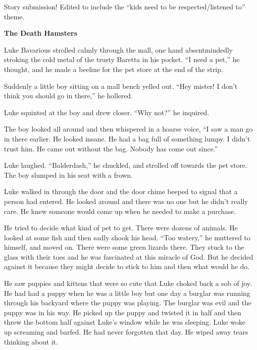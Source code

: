 

Story submission! Edited to include the ``kids need to be
respected/listened to'' theme.



{\bf The Death Hamsters}



Luke Bavarious strolled calmly through the mall, one hand
absentmindedly stroking the cold metal of the trusty Baretta in his
pocket. ``I need a pet,'' he thought, and he made a beeline for the
pet store at the end of the strip.



Suddenly a little boy sitting on a mall bench yelled out. ``Hey
mister! I don't think you should go in there,'' he hollered.



Luke squinted at the boy and drew closer. ``Why not?'' he
inquired.



The boy looked all around and then whispered in a hoarse voice, ``I
saw a man go in there earlier. He looked insane. He had a bag full
of something lumpy. I didn't trust him. He came out without the
bag. Nobody has come out since.''



Luke laughed. ``Balderdash,'' he chuckled, and strolled off towards
the pet store. The boy slumped in his seat with a frown.



Luke walked in through the door and the door chime beeped to signal
that a person had entered. He looked around and there was no one
but he didn't really care. He knew someone would come up when he
needed to make a purchase.



He tried to decide what kind of pet to get. There were dozens of
animals. He looked at some fish and then sadly shook his head. ``Too
watery,'' he muttered to himself, and moved on. There were some
green lizards there. They stuck to the glass with their toes and he
was fascinated at this miracle of God. But he decided against it
because they might decide to stick to him and then what would he
do.



He saw puppies and kittens that were so cute that Luke choked back
a sob of joy. He had had a puppy when he was a little boy but one
day a burglar was running through his backyard where the puppy was
playing. The burglar was evil and the puppy was in his way. He
picked up the puppy and twisted it in half and then threw the
bottom half against Luke's window while he was sleeping. Luke woke
up screaming and barfed. He had never forgotten that day. He wiped
away tears thinking about it.



